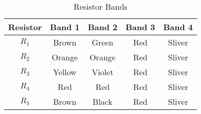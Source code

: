 \documentclass{article}
\begin{document}


\begin{table}[h]
\begin{center}
\label{code:resis}
\begin{tabular}{c|c|c|c|c}
Resistor & Band 1 & Band 2 & Band 3 & Band 4 
\\\hline
$R_1$ & Brown & Green & Red & Sliver\\
$R_2$& Orange & Orange & Red & Sliver\\
$R_3$ & Yellow & Violet & Red & Sliver\\
$R_4$ & Red & Red & Red & Sliver\\
$R_5$ & Brown & Black & Red & Sliver\\
\end{tabular}
\end{center}
\caption{Resistor Bands}

\end{table}

\end{document}
